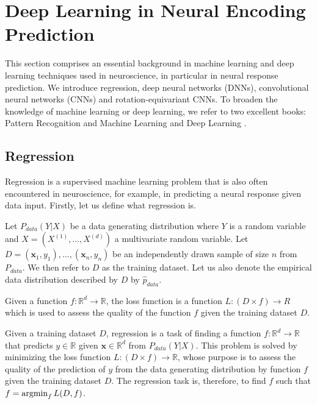 \overfullrule=0pt
\chapter{Deep Learning in Neural Encoding Prediction}

This section comprises an essential background in machine learning and deep learning techniques used in neuroscience, in particular in neural response prediction. We introduce regression, deep neural networks (DNNs), convolutional neural networks (CNNs) and rotation-equivariant CNNs. To broaden the knowledge of machine learning or deep learning, we refer to two excellent books: Pattern Recognition and Machine Learning \citep{bishop2006pattern} and Deep Learning \citep{Goodfellow-et-al-2016}.

\section{Regression}\label{section:regression}

Regression is a supervised machine learning problem that is also often encountered in neuroscience, for example, in predicting a neural response given data input. Firstly, let us define what regression is.

\begin{defn}\label{def01:1}
	Let $P_{data}(Y|X)$ be a data generating distribution where $Y$ is a random variable and $X = (X^{(1)}, … , X^{(d)})$ a multivariate random variable. Let $D = {(\textbf{x}_1, y_1), \dots, (\textbf{x}_n, y_n)}$ be an independently drawn sample of size $n$ from $P_{data}$. We then refer to $D$ as the training dataset. Let us also denote the empirical data distribution described by $D$ by $\hat{p}_{data}$.
\end{defn}

\begin{defn}\label{def01:2}
Given a function $f: \mathbb{R}^d \to \mathbb{R}$, the loss function is a function $L: (D \times f) \to R$ which is used to assess the quality of the function $f$ given the training dataset $D$.
\end{defn}

\begin{defn}[Regression]\label{def01:3}
Given a training dataset $D$, regression is a task of finding a function $f: \mathbb{R}^d \to \mathbb{R}$ that predicts $y \in \mathbb{R}$ given $\textbf{x} \in \mathbb{R}^d$ from $P_{data}(Y|X)$. This problem is solved by minimizing the loss function $L: (D \times f) \to \mathbb{R}$, whose purpose is to assess the quality of the prediction of $y$ from the data generating distribution by function $f$ given the training dataset $D$. The regression task is, therefore, to find $f$ such that $f = \operatorname*{argmin}_{f} L(D, f)$. 
\end{defn}


